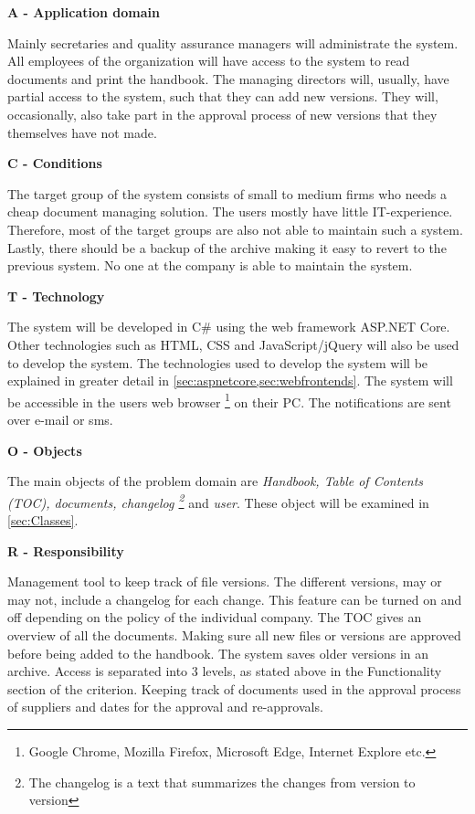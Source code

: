 \textbf{A - Application domain}

Mainly secretaries and quality assurance managers will administrate the system.
All employees of the organization will have access to the system to read documents and print the handbook.
The managing directors will, usually, have partial access to the system, such that they can add new versions.
They will, occasionally, also take part in the approval process of new versions that they themselves have not made.

\textbf{C - Conditions} \label{sec:conditions}

The target group of the system consists of small to medium firms who needs a cheap document managing solution.
The users mostly have little IT-experience.
Therefore, most of the target groups are also not able to maintain such a system.
Lastly, there should be a backup of the archive making it easy to revert to the previous system.
No one at the company is able to maintain the system.

\textbf{T - Technology}

The system will be developed in C\# using the web framework ASP.NET Core.
Other technologies such as HTML, CSS and JavaScript/jQuery will also be used to develop the system.
The technologies used to develop the system will be explained in greater detail in \cref{sec:aspnetcore,sec:webfrontends}.
The system will be accessible in the users web browser \footnote{Google Chrome, Mozilla Firefox, Microsoft Edge, Internet Explore etc.} on their PC.
The notifications are sent over e-mail or sms.

\textbf{O - Objects}

The main objects of the problem domain are \textit{Handbook, Table of Contents (TOC), documents, changelog \footnote{The changelog is a text that summarizes the changes from version to version}} and \textit{user}.
These object will be examined in \cref{sec:Classes}.

\textbf{R  - Responsibility}

Management tool to keep track of file versions.
The different versions, may or may not, include a changelog for each change.
This feature can be turned on and off depending on the policy of the individual company.
The TOC gives an overview of all the documents.
Making sure all new files or versions are approved before being added to the handbook.
The system saves older versions in an archive.
Access is separated into 3 levels, as stated above in the Functionality section of the criterion.
Keeping track of documents used in the approval process of suppliers and dates for the approval and re-approvals.

